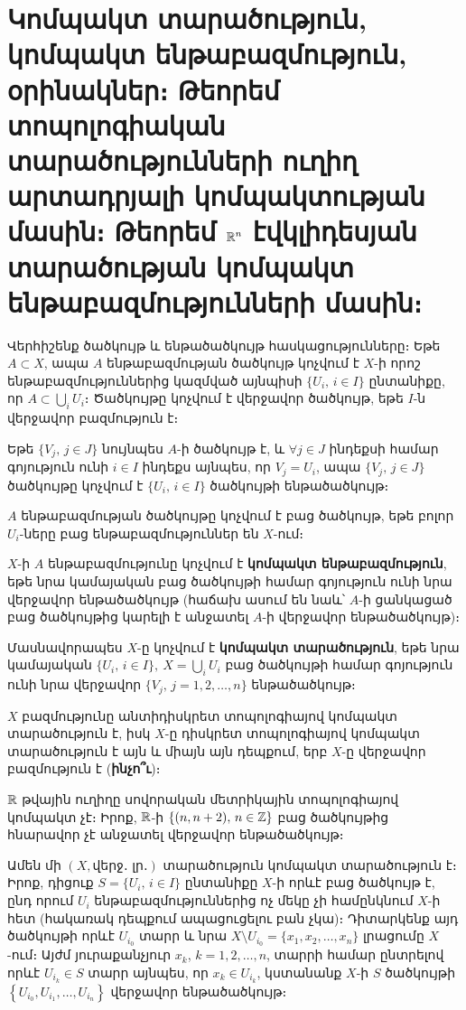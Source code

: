 \documentclass[./main.tex]{subfiles}
\begin{document}
\onehalfspacing
\section{Կոմպակտ տարածություն, կոմպակտ ենթաբազմություն, օրինակներ։ Թեորեմ տոպոլոգիական տարածությունների ուղիղ արտադրյալի կոմպակտության մասին։ Թեորեմ $\mathbb{R}^n$ էվկլիդեսյան տարածության կոմպակտ ենթաբազմությունների մասին։}\label{sec:16}

Վերհիշենք ծածկույթ և ենթածածկույթ հասկացությունները։ Եթե $A\subset X$, ապա $A$ ենթաբազմության ծածկույթ կոչվում է $X$-ի որոշ ենթաբազմություններից կազմ\-ված այնպիսի $\{ U_i,\, i\in I\} $ ընտանիքը, որ $A\subset \bigcup\limits_i U_i$։ Ծածկույթը կոչվում է վերջավոր ծածկույթ, եթե $I$-ն վերջավոր բազմություն է։
\par Եթե $\{V_j,\, j\in J\}$ նույնպես $A$-ի ծածկույթ է, և $\forall j\in J$ ինդեքսի համար գոյություն ունի $i\in I$ ինդեքս այնպես, որ $V_j=U_i$, ապա $\{V_j,\, j\in J\}$ ծածկույթը կոչվում է $\{U_i,\, i\in I\}$ ծածկույթի ենթածածկույթ։
\par $A$ ենթաբազմության ծածկույթը կոչվում է բաց ծածկույթ, եթե բոլոր $U_i$-ները բաց ենթաբազմություններ են $X$-ում։
\begin{definition} $X$-ի $A$ ենթաբազմությունը կոչվում է \textbf{կոմպակտ ենթաբազմություն}, եթե նրա կամայական բաց ծածկույթի համար գոյություն ունի նրա վերջավոր են\-թա\-ծած\-կույթ (հաճախ ասում են նաև՝ $A$-ի ցանկացած բաց ծածկույթից կարելի է ան\-ջա\-տել $A$-ի վերջավոր ենթածածկույթ)։
\end{definition}
\par Մասնավորապես $X$-ը կոչվում է \textbf{կոմպակտ տարածություն}, եթե նրա կա\-մա\-յա\-կան $\{U_i,\, i\in I\},\ X=\bigcup\limits_i U_i$ բաց ծածկույթի համար գոյություն ունի նրա վերջավոր $\{V_j,\, j=1,2,\dots,n\}$ ենթածածկույթ։
\begin{example}\label{ch16ex1}
$X$ բազմությունը անտիդիսկրետ տոպոլոգիայով կոմպակտ տարա\-ծություն է, իսկ $X$-ը դիսկրետ տոպոլոգիայով կոմպակտ տարածություն է այն և միայն այն դեպքում, երբ $X$-ը վերջավոր բազմություն է (\textbf{ինչո՞ւ})։
\end{example}
\begin{example}\label{ch16ex2}
$\mathbb{R}$ թվային ուղիղը սովորական մետրիկային տոպոլոգիայով կոմ\-պակտ չէ։ Իրոք, $\mathbb{R}$-ի $\{(n,n+2),\, n\in \mathbb{Z}\}$ բաց ծածկույթից հնարավոր չէ անջատել վեր\-ջա\-վոր ենթածածկույթ։
\end{example}

\begin{example}\label{ch16ex3}
Ամեն մի $(X, \text{վերջ․ լր․})$ տարածություն կոմպակտ տարածություն է։ Իրոք, դիցուք $S = \{U_i,\,  i \in I\}$ ընտանիքը $X$-ի որևէ բաց ծածկույթ է, ընդ որում $U_i$ ենթաբազմություններից ոչ մեկը չի համընկնում $X$-ի հետ (հակառակ դեպքում ապա\-ցուցելու բան չկա)։ Դիտարկենք այդ ծածկույթի որևէ $U_{i_0}$ տարր և նրա ${X \setminus U_{i_0}} = \{x_1, x_2, \dots, x_n\}$ լրացումը $X$-ում։ Այժմ յուրաքանչյուր $x_k$, $k=1, 2, \dots, n$, տարրի համար ընտրելով որևէ $U_{i_k} \in S$ տարր այնպես, որ $x_k \in U_{i_k}$, կստանանք $X$-ի $S$ ծած\-կույ\-թի $\left\{U_{i_0}, U_{i_1}, \dots, U_{i_n}\right\}$ վերջավոր ենթածածկույթ։
\end{example}
\end{document}
